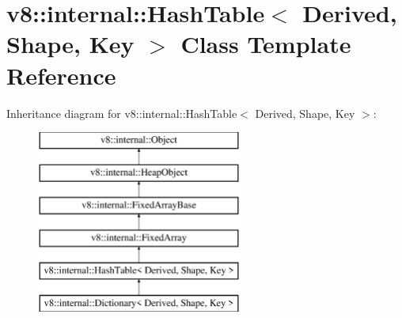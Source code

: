 \hypertarget{classv8_1_1internal_1_1_hash_table}{}\section{v8\+:\+:internal\+:\+:Hash\+Table$<$ Derived, Shape, Key $>$ Class Template Reference}
\label{classv8_1_1internal_1_1_hash_table}
Inheritance diagram for v8\+:\+:internal\+:\+:Hash\+Table$<$ Derived, Shape, Key $>$\+:\begin{figure}[H]
\begin{center}
\leavevmode
\includegraphics[height=6.000000cm]{classv8_1_1internal_1_1_hash_table}
\end{center}
\end{figure}
